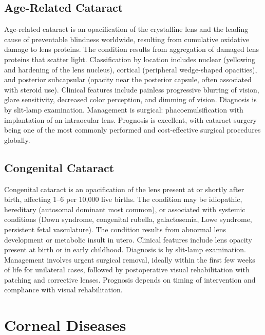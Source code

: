 \subsection{Age-Related Cataract}
\label{sec:Age-Related Cataract}
Age-related cataract is an opacification of the crystalline lens and the leading cause of preventable blindness worldwide, resulting from cumulative oxidative damage to lens proteins. The condition results from aggregation of damaged lens proteins that scatter light. Classification by location includes nuclear (yellowing and hardening of the lens nucleus), cortical (peripheral wedge-shaped opacities), and posterior subcapsular (opacity near the posterior capsule, often associated with steroid use). Clinical features include painless progressive blurring of vision, glare sensitivity, decreased color perception, and dimming of vision. Diagnosis is by slit-lamp examination. Management is surgical: phacoemulsification with implantation of an intraocular lens. Prognosis is excellent, with cataract surgery being one of the most commonly performed and cost-effective surgical procedures globally.

\subsection{Congenital Cataract}
\label{sec:Congenital Cataract}
Congenital cataract is an opacification of the lens present at or shortly after birth, affecting 1--6 per 10,000 live births. The condition may be idiopathic, hereditary (autosomal dominant most common), or associated with systemic conditions (Down syndrome, congenital rubella, galactosemia, Lowe syndrome, persistent fetal vasculature). The condition results from abnormal lens development or metabolic insult in utero. Clinical features include lens opacity present at birth or in early childhood. Diagnosis is by slit-lamp examination. Management involves urgent surgical removal, ideally within the first few weeks of life for unilateral cases, followed by postoperative visual rehabilitation with patching and corrective lenses. Prognosis depends on timing of intervention and compliance with visual rehabilitation.

\section{Corneal Diseases}

